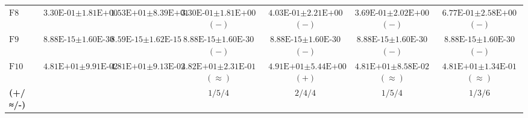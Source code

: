 \begin{table}[htbp]
\begin{tabular}{lcccccc}
$\text{F8}$ & $\text{3.30E-01}\pm\text{1.81E+00}$ & $\text{1.53E+01}\pm\text{8.39E+01}$ & $\text{3.30E-01}\pm\text{1.81E+00}$ $(-)$ & $\text{4.03E-01}\pm\text{2.21E+00}$ $(-)$ & $\text{3.69E-01}\pm\text{2.02E+00}$ $(-)$ & $\text{6.77E-01}\pm\text{2.58E+00}$ $(-)$ \\
$\text{F9}$ & $\text{8.88E-15}\pm\text{1.60E-30}$ & $\text{8.59E-15}\pm\text{1.62E-15}$ & $\text{8.88E-15}\pm\text{1.60E-30}$ $(-)$ & $\text{8.88E-15}\pm\text{1.60E-30}$ $(-)$ & $\text{8.88E-15}\pm\text{1.60E-30}$ $(-)$ & $\text{8.88E-15}\pm\text{1.60E-30}$ $(-)$ \\
$\text{F10}$ & $\text{4.81E+01}\pm\text{9.91E-02}$ & $\text{4.81E+01}\pm\text{9.13E-02}$ & $\text{4.82E+01}\pm\text{2.31E-01}$ $(\approx)$ & $\text{4.91E+01}\pm\text{5.44E+00}$ $(+)$ & $\text{4.81E+01}\pm\text{8.58E-02}$ $(\approx)$ & $\text{4.81E+01}\pm\text{1.34E-01}$ $(\approx)$ \\
\textbf{(+/≈/-)} &  &  & \textbf{$\text{1/5/4}$} & \textbf{$\text{2/4/4}$} & \textbf{$\text{1/5/4}$} & \textbf{$\text{1/3/6}$} \\
\bottomrule
\end{tabular}
\endgroup
\end{table}
